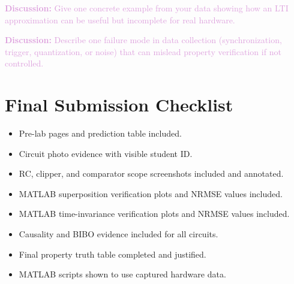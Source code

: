 \documentclass[11pt,letterpaper]{article}
\providecommand{\disECE}[1]{\textcolor{Plum}{\textbf{Discussion:} #1}}
\begin{document}
\disECE{Give one concrete example from your data showing how an LTI approximation can be useful but incomplete for real hardware.}

\disECE{Describe one failure mode in data collection (synchronization, trigger, quantization, or noise) that can mislead property verification if not controlled.}

\section*{Final Submission Checklist}
\begin{itemize}
    \item[\(\square\)] Pre-lab pages and prediction table included.
    \item[\(\square\)] Circuit photo evidence with visible student ID.
    \item[\(\square\)] RC, clipper, and comparator scope screenshots included and annotated.
    \item[\(\square\)] MATLAB superposition verification plots and NRMSE values included.
    \item[\(\square\)] MATLAB time-invariance verification plots and NRMSE values included.
    \item[\(\square\)] Causality and BIBO evidence included for all circuits.
    \item[\(\square\)] Final property truth table completed and justified.
    \item[\(\square\)] MATLAB scripts shown to use captured hardware data.
\end{itemize}
\end{document}
